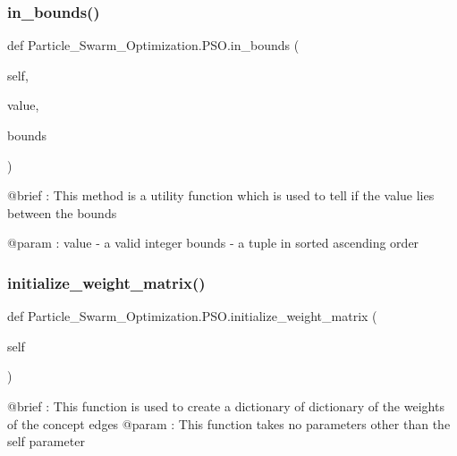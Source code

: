 \subsubsection{\texorpdfstring{in\+\_\+bounds()}{in\_bounds()}}
{\footnotesize\ttfamily def Particle\+\_\+\+Swarm\+\_\+\+Optimization.\+P\+S\+O.\+in\+\_\+bounds (\begin{DoxyParamCaption}\item[{}]{self,  }\item[{}]{value,  }\item[{}]{bounds }\end{DoxyParamCaption})}

\begin{DoxyVerb}@brief : This method is a utility function which is used to tell if the value lies between the bounds

@param : value - a valid integer
   bounds - a tuple in sorted ascending order\end{DoxyVerb}
 \hypertarget{class_particle___swarm___optimization_1_1_p_s_o_a88adc64e6121ec070e2736145edabd4c}{}\label{class_particle___swarm___optimization_1_1_p_s_o_a88adc64e6121ec070e2736145edabd4c} 
\subsubsection{\texorpdfstring{initialize\+\_\+weight\+\_\+matrix()}{initialize\_weight\_matrix()}}
{\footnotesize\ttfamily def Particle\+\_\+\+Swarm\+\_\+\+Optimization.\+P\+S\+O.\+initialize\+\_\+weight\+\_\+matrix (\begin{DoxyParamCaption}\item[{}]{self }\end{DoxyParamCaption})}

\begin{DoxyVerb}@brief : This function is used to create a dictionary of dictionary of the weights of the concept edges
@param : This function takes no parameters other than the self parameter
\end{DoxyVerb}
 \hypertarget{class_particle___swarm___optimization_1_1_p_s_o_a9a1612724d06d65b4046b5ff26cb9cef}{}\label{class_particle___swarm___optimization_1_1_p_s_o_a9a1612724d06d65b4046b5ff26cb9cef} 
